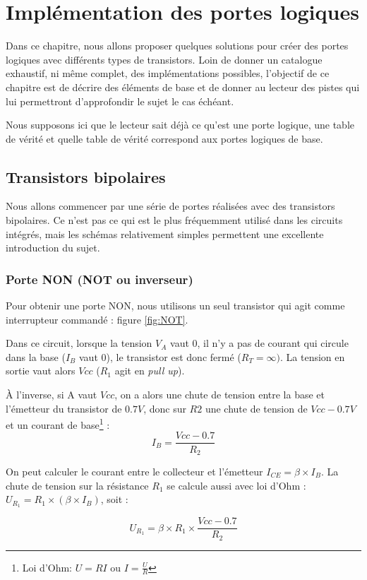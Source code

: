 \documentclass[a4paper,11pt]{book}
\theoremstyle{definition}
\begin{document}
\chapter{Implémentation des portes logiques}
Dans ce chapitre, nous allons proposer quelques solutions pour créer des portes logiques avec différents types de transistors. Loin de donner un catalogue exhaustif, ni même complet, des implémentations possibles, l'objectif de ce chapitre est de décrire des éléments de base et de donner au lecteur des pistes qui lui permettront d'approfondir le sujet le cas échéant.

Nous supposons ici que le lecteur sait déjà ce qu'est une porte logique, une table de vérité et quelle table de vérité correspond aux portes logiques de base.

\section{Transistors bipolaires}
Nous allons commencer par une série de portes réalisées avec des transistors bipolaires. Ce n'est pas ce qui est le plus fréquemment utilisé dans les circuits intégrés, mais les schémas relativement simples permettent une excellente introduction du sujet.

\subsection{Porte NON (NOT ou inverseur)}
Pour obtenir une porte NON, nous utilisons un seul transistor qui agit comme interrupteur commandé : figure \ref{fig:NOT}.

Dans ce circuit, lorsque la tension $V_A$ vaut 0, il n'y a pas de courant qui circule dans la base ($I_B$ vaut 0), le transistor est donc fermé ($R_T = \infty)$. La tension en sortie vaut alors $Vcc$ ($R_1$ agit en \emph{pull up}).

À l'inverse, si A vaut $Vcc$, on a alors une chute de tension entre la base et l'émetteur du transistor de $0.7V$, donc sur $R2$ une chute de tension de $Vcc - 0.7V$ et un courant de base\footnote{Loi d'Ohm: $U=RI$ ou $I = \frac{U}{R}$} :
\[I_B = \frac{Vcc - 0.7}{R_2}\]

On peut calculer le courant entre le collecteur et l'émetteur $I_{CE} = \beta \times I_B$. La chute de tension sur la résistance $R_1$ se calcule aussi avec loi d'Ohm : $U_{R_1} = R_1 \times (\beta \times I_B)$, soit : 

\[U_{R_1} = \beta \times R_1 \times \frac{Vcc - 0.7}{R_2}  \]
\end{document}
